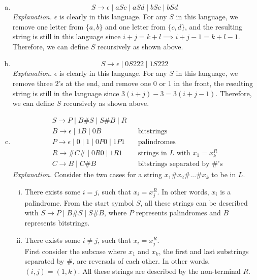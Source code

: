 \documentclass[11pt]{article}
\begin{document}

\begin{solution}
\begin{enumerate}[(a)]
\item
\begin{equation*}
S\to \epsilon \mid aSc \mid aSd \mid bSc \mid bSd
\end{equation*}
\emph{Explanation. }$\epsilon$ is clearly in this language. For any $S$ in this language, we remove one letter from $\{a, b\}$ and one letter from $\{c, d\}$, and the resulting string is still in this language since $i+j=k+l\implies i+j-1=k+l-1$. Therefore, we can define $S$ recursively as shown above.
\item
\begin{equation*}
S\to \epsilon \mid 0S222 \mid 1S222
\end{equation*}
\emph{Explanation. }$\epsilon$ is clearly in this language. For any $S$ in this language, we remove three $2$'s at the end, and remove one $0$ or $1$ in the front, the resulting string is still in the language since $3(i+j)-3=3(i+j-1)$. Therefore, we can define $S$ recursively as shown above.
\item
\begin{align*}
&S\to P \mid B\#S \mid S\#B \mid R\\
&B\to \epsilon \mid 1B \mid 0B &&\text{bitstrings}\\
&P\to \epsilon \mid 0 \mid 1 \mid 0P0 \mid 1P1 &&\text{palindromes}\\
&R\to \#C\# \mid 0R0 \mid 1R1 &&\text{strings in $L$ with $x_1=x_k^R$}\\
&C\to B \mid C\#B &&\text{bitstrings separated by $\#$'s}
\end{align*}
\emph{Explanation. }Consider the two cases for a string $x_1\#x_2\#...\#x_k$ to be in $L$.
\begin{enumerate}[i.]
\item There exists some $i=j$, such that $x_i = x_j^R$. In other words, $x_i$ is a palindrome. From the start symbol $S$, all these strings can be described with $S\to P \mid B\#S \mid S\#B$, where $P$ represents palindromes and $B$ represents bitstrings.
\item There exists some $i\neq j$, such that $x_i = x_j^R$.\\
First consider the subcase where $x_1$ and $x_k$, the first and last substrings separated by $\#$, are reversals of each other. In other words, $(i,j)=(1,k)$. All these strings are described by the non-terminal $R$.\\

\end{enumerate}
\end{enumerate}
\end{solution}
\end{document}
